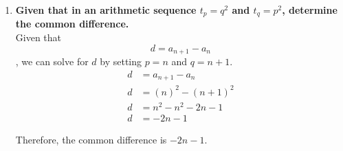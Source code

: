 \documentclass[12pt]{article}
\begin{document}
\begin{enumerate}
    \item \textbf{Given that in an arithmetic sequence $t_p = q^2$ and $t_q = p^2$, determine the common difference.} \\
    
    Given that $$d = a_{n + 1} - a_{n}$$, we can solve for $d$ by setting $p = n$ and $q = n + 1$.
    \begin{align*}
        d &= a_{n + 1} - a_{n} \\
        d & = (n)^2 - (n + 1)^2 \\
        d & = n^2 - n^2 - 2n - 1 \\
        d & = -2n - 1
    \end{align*}
    
    Therefore, the common difference is $-2n - 1$.
    
\end{enumerate}
\end{document}
